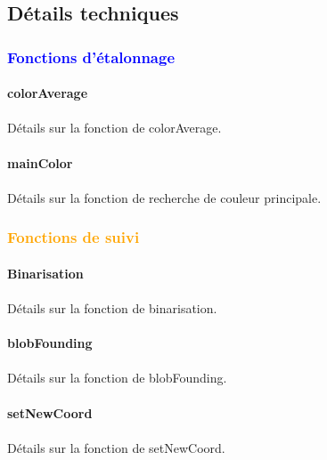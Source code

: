 \documentclass{report}
\begin{document}
				\subsection{Détails techniques}
					\subsubsection{\textcolor{blue}{Fonctions d'étalonnage}}
						\paragraph{colorAverage} \paragraph{}
						Détails sur la fonction de colorAverage.
						\paragraph{mainColor} \paragraph{}
						Détails sur la fonction de recherche de couleur principale.
					\subsubsection{\textcolor{orange}{Fonctions de suivi}}
						\paragraph{Binarisation} \paragraph{}
							Détails sur la fonction de binarisation.
						\paragraph{blobFounding} \paragraph{}
						Détails sur la fonction de blobFounding.
						\paragraph{setNewCoord} \paragraph{}
						Détails sur la fonction de setNewCoord.
\end{document}
